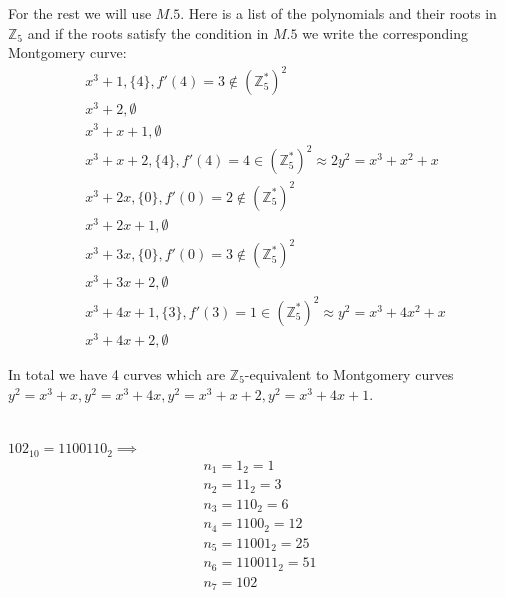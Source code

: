 \documentclass[12pt, a4paper]{article}
\begin{document}
For the rest we will use $M.5$. Here is a list of the polynomials and their roots in $\mathbb{Z}_5$ and if the roots satisfy the condition in $M.5$ we write the corresponding Montgomery curve:
\begin{align*}
& x^3+1,\{4\}, f'(4) = 3 \notin (\mathbb{Z}_5^*)^2\\
& x^3+2, \emptyset \\
& x^3 + x + 1, \emptyset \\
& x^3 + x + 2, \{4\}, f'(4) = 4 \in (\mathbb{Z}_5^*)^2 \approx 2y^2=x^3+x^2+x\\
& x^3 + 2x, \{0\}, f'(0) = 2 \notin (\mathbb{Z}_5^*)^2\\
& x^3 + 2x+1, \emptyset\\
& x^3 +3x, \{0\}, f'(0) = 3 \notin (\mathbb{Z}_5^*)^2\\
& x^3 +3x+2, \emptyset\\
& x^3 +4x+1, \{3\}, f'(3)=1 \in (\mathbb{Z}_5^*)^2 \approx y^2=x^3+4x^2+x\\
& x^3 +4x+2, \emptyset
\end{align*}

In total we have 4 curves which are $\mathbb{Z}_5$-equivalent to Montgomery curves $y^2=x^3+x, y^2=x^3+4x, y^2=x^3 + x + 2, y^2=x^3 +4x+1$.

\section{}
$102_{10} = 1100110_2 \implies$
\begin{gather*}
n_1 = 1_2 = 1\\
n_2 = 11_2 = 3\\
n_3 = 110_2 = 6\\
n_4 = 1100_2 = 12\\
n_5 = 11001_2 = 25\\
n_6 = 110011_2 = 51\\
n_7 = 102
\end{gather*}
\end{document}
